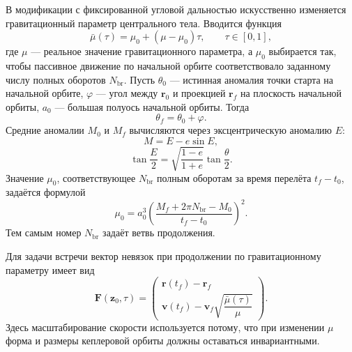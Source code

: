 В модификации с фиксированной угловой дальностью искусственно изменяется гравитационный параметр центрального тела. Вводится функция
\begin{equation}
	\bar\mu(\tau)=\mu_0+(\mu-\mu_0)\tau,
	\qquad
	\tau\in[0,1],
\end{equation}
где \(\mu\) --- реальное значение гравитационного параметра, а \(\mu_0\) выбирается так, чтобы пассивное движение по начальной орбите соответствовало заданному числу полных оборотов \(N_{\mathrm{br}}\). Пусть \(\theta_0\) --- истинная аномалия точки старта на начальной орбите, \(\varphi\) --- угол между \(\mathbf r_0\) и проекцией \(\mathbf r_f\) на плоскость начальной орбиты, \(a_0\) --- большая полуось начальной орбиты. Тогда
\begin{equation}
	\theta_f=\theta_0+\varphi.
\end{equation}
Средние аномалии \(M_0\) и \(M_f\) вычисляются через эксцентрическую аномалию \(E\):
\begin{equation}
	M=E-e\sin E,
\end{equation}
\begin{equation}
	\tan\frac{E}{2}
	=
	\sqrt{\frac{1-e}{1+e}}
	\tan\frac{\theta}{2}.
\end{equation}
Значение \(\mu_0\), соответствующее \(N_{\mathrm{br}}\) полным оборотам за время перелёта \(t_f-t_0\), задаётся формулой
\begin{equation}
	\mu_0
	=
	a_0^3
	\left(
	\frac{M_f+2\pi N_{\mathrm{br}}-M_0}{t_f-t_0}
	\right)^2.
\end{equation}
Тем самым номер \(N_{\mathrm{br}}\) задаёт ветвь продолжения.

Для задачи встречи вектор невязок при продолжении по гравитационному параметру имеет вид
\begin{equation}
	\mathbf F(\mathbf z_0,\tau)
	=
	\begin{pmatrix}
		\mathbf r(t_f)-\mathbf r_f\\
		\mathbf v(t_f)-\mathbf v_f\sqrt{\dfrac{\bar\mu(\tau)}{\mu}}
	\end{pmatrix}.
\end{equation}
Здесь масштабирование скорости используется потому, что при изменении \(\mu\) форма и размеры кеплеровой орбиты должны оставаться инвариантными.

